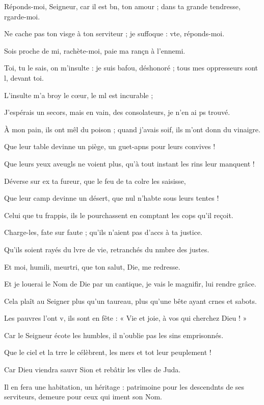 \item Réponds-moi, Seigneur, car il est bn, ton amour ; dans ta grande tendresse, rgarde-moi.
\item Ne cache pas ton visge à ton serviteur ; je suffoque : vte, réponds-moi. 
\item Sois proche de mi, rachète-moi, paie ma rançn à l’ennemi.
\item Toi, tu le sais, on m’insulte : je suis bafou, déshonoré ; tous mes oppresseurs sont l, devant toi.
\item L’insulte m’a broy le cœur, le ml est incurable ;
\item J’espérais un secors, mais en vain, des consolateurs, je n’en ai ps trouvé.
\item À mon pain, ils ont mêl du poison ; quand j’avais soif, ils m’ont donn du vinaigre.
\item Que leur table devinne un piège, un guet-apns pour leurs convives !
\item Que leurs yeux aveugls ne voient plus, qu’à tout instant les rins leur manquent !
\item Déverse sur ex ta fureur, que le feu de ta colre les saisisse,
\item Que leur camp devinne un désert, que nul n’habte sous leurs tentes !
\item Celui que tu frappis, ils le pourchassent en comptant les cops qu’il reçoit.
\item Charge-les, fate sur faute ; qu’ils n’aient pas d’accs à ta justice.
\item Qu’ils soient rayés du lvre de vie, retranchés du nmbre des justes.
\item Et moi, humili, meurtri, que ton salut, Die, me redresse.
\item Et je louerai le Nom de Die par un cantique, je vais le magnifir, lui rendre grâce.
\item Cela plaît au Seigner plus qu’un taureau, plus qu’une bête ayant crnes et sabots.
\item Les pauvres l’ont v, ils sont en fête : « Vie et joie, à vos qui cherchez Dieu ! »
\item Car le Seigneur écote les humbles, il n’oublie pas les sins emprisonnés.
\item Que le ciel et la trre le célèbrent, les mers et tot leur peuplement !
\item Car Dieu viendra sauvr Sion et rebâtir les vlles de Juda. 
\item Il en fera une habitation, un héritage : patrimoine pour les descendnts de ses serviteurs, demeure pour ceux qui iment son Nom.